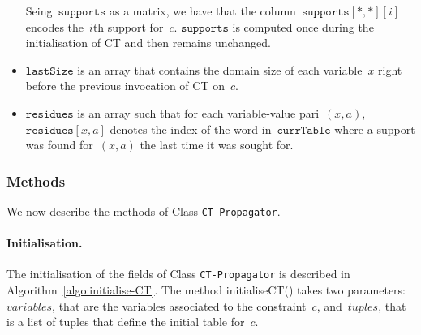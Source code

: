 \documentclass[a4paper,11pt]{article}
\newcommand{\Algoref}[1]{Algorithm~\ref{#1}}
\newcommand{\CurrTable}{\texttt{currTable}}
\newcommand{\LastSizes}{\texttt{lastSize}}
\newcommand{\Supports}{\texttt{supports}}
\newcommand{\Residues}{\texttt{residues}}
\newcommand{\localvar}[1]{\mathit{#1}}
\numberwithin{equation}{section}
\begin{document}
\begin{itemize}
    Seing~$\Supports$ as a matrix, we have that the column~$\Supports[*,*][i]$ encodes
    the~$i$th support for~$c$. $\Supports$ is computed once during the initialisation of CT and then
    remains unchanged.
    
  \item $\LastSizes$ is an array that contains the domain size of each
    variable~$x$ right before the previous invocation of CT on~$c$.

  \item $\Residues$ is an array such that for each variable-value pari~$(x,a)$,
    $\Residues[x,a]$ denotes the index of the word in~$\CurrTable$ where a support
    was found for~$(x,a)$ the last time it was sought for.

\end{itemize}

\subsubsection{Methods}

We now describe the methods of Class \texttt{CT-Propagator}.

\paragraph{Initialisation.}
The initialisation of the fields of Class \texttt{CT-Propagator} is described in
\Algoref{algo:initialise-CT}. The method initialiseCT() takes two parameters:
$\localvar{variables}$, that are the variables associated to the constraint~$c$,
and~$\localvar{tuples}$, that is a list of tuples that define the initial table for~$c$.
\end{document}
